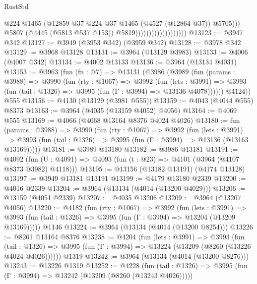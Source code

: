 \begin{lexlean}{RustStd}
\begin{coremodule}
                                              @224
                                              @1465
                                              (@12859
                                                @37
                                                @224
                                                @37
                                                @1465
                                                (@4527 (@12864 @37))
                                                @5705)))
                                          @5807
                                          (@4445 (@5813 @537 @153))
                                          @5819)))))))))))))))))))
@13123 := @3947 @342
@13127 := @3949 (@3953 @342) (@3959 @342)
@13128 := @3978 @342
@13129 := @3968 @13128
@13131 := @3964 (@13129 @3983)
@13133 := @4006 (@4007 @342)
@13134 := @4002 @13133
@13136 := @3964 (@13134 @4031)
@13153 := @3963
    (fun (fn : @7) =>
    @13131
      (@3986
        (@3989
          (fun (params : @3988) =>
          @3990
            (fun (rty : @1067) =>
            @3992
              (fun (lets : @3991) =>
              @3993 (fun (tail : @1326) => @3995 (fun (Γ : @3994) => @13136 @4078))))))
        @4124))
    @555
@13156 := @4130 (@13129 (@3981 @555))
@13159 := @4043 (@4044 @555) @8373
@13163 := @3964 (@4035 (@13159 @4052) @4056)
@13164 := @4069 @555
@13169 := @4066 (@4068 @13164 @8376 @4024 @4026)
@13180 := fun (params : @3988) =>
  @3990
    (fun (rty : @1067) =>
    @3992
      (fun (lets : @3991) =>
      @3993 (fun (tail : @1326) => @3995 (fun (Γ : @3994) => @13136 (@13163 @13169)))))
@13181 := @3989 @13180
@13182 := @3986 @13181
@13191 := @4092
    (fun (U : @4091) => @4093 (fun (t : @23) => @4101 (@3964 (@4107 @8373 @3982) @4118)))
@13195 := @13156 (@13182 @13191) (@4174 @13128)
@13197 := @3949 @13181 @13191
@13199 := @4179 @13180 @2339
@13200 := @4016 @2339
@13204 := @3964 (@13134 (@4014 (@13200 @4029)))
@13206 := @13159 (@4051 @2339)
@13207 := @4035 @13206
@13209 := @3964 (@13207 @4056)
@13220 := @4182
    (fun (rty : @1067) =>
    @3992
      (fun (lets : @3991) =>
      @3993 (fun (tail : @1326) => @3995 (fun (Γ : @3994) => @13204 (@13209 @13169)))))
    @1146
@13224 := @3964 (@13134 (@4014 (@13200 @8254)))
@13226 := @8261 @13164 @8376
@13238 := @4204
    (fun (lets : @3991) =>
    @3993
      (fun (tail : @1326) =>
      @3995 (fun (Γ : @3994) => @13224 (@13209 (@8260 (@13226 @4024 @4026))))))
    @1319
@13242 := @3964 (@13134 (@4014 (@13200 @8276)))
@13243 := @13226 @1319
@13252 := @4228
    (fun (tail : @1326) => @3995 (fun (Γ : @3994) => @13242 (@13209 (@8260 (@13243 @4026)))))

\end{coremodule}
\end{lexlean}
